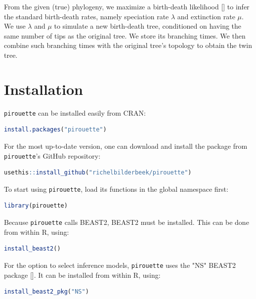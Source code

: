 \documentclass{article}
\begin{document}
From the given (true) phylogeny, we maximize a birth-death 
likelihood [\cite{nee1994reconstructed}] to infer the standard 
birth-death rates, namely speciation rate $\lambda$ and extinction rate $\mu$.
We use $\lambda$ and $\mu$ to simulate a new birth-death tree, 
conditioned on having the same number of tips as the original tree. 
We store its branching times. 
We then combine such branching times with the original tree's 
topology to obtain the twin tree.

\section{Installation}

\verb;pirouette; can be installed easily from CRAN:

\begin{lstlisting}[language=R, floatplacement=H, frame=single]
install.packages("pirouette")
\end{lstlisting}

For the most up-to-date version, 
one can download and install the package from \verb;pirouette;'s GitHub repository:

\begin{lstlisting}[language=R, floatplacement=H, frame=single]
usethis::install_github("richelbilderbeek/pirouette")
\end{lstlisting}

To start using \verb;pirouette;, load its functions in the global namespace first:

\begin{lstlisting}[language=R, floatplacement=H, frame=single]
library(pirouette)
\end{lstlisting}
Because \verb;pirouette; calls BEAST2, BEAST2 must be installed. 
This can be done from within R, using:

\begin{lstlisting}[language=R, floatplacement=H, frame=single]
install_beast2()
\end{lstlisting}
For the option to select inference models,
\verb;pirouette; uses the "NS" BEAST2 package [\cite{maturana2018model}].
It can be installed from within R, using:

\begin{lstlisting}[language=R, floatplacement=H, frame=single]
install_beast2_pkg("NS")
\end{lstlisting}
\end{document}
